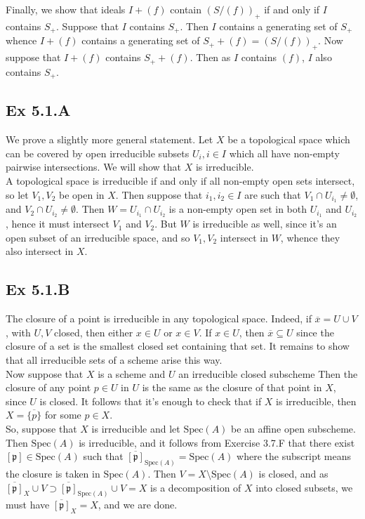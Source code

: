 \documentclass{article}
\theoremstyle{definition}
\newcommand{\Spec}{\text{Spec}}
\begin{document}
Finally, we show that ideals $I + (f)$ contain $(S/(f))_{+}$ if and only if $I$
contains $S_{+}$. Suppose that $I$ contains $S_{+}$. Then $I$ contains a
generating set of $S_{+}$ whence $I + (f)$ contains a generating set of $S_{+}
	+ (f) = (S/(f))_{+}$. Now suppose that $I + (f)$ contains $S_{+} + (f)$. Then
as $I$ contains $(f)$, $I$ also contains $S_{+}$.

\subsection*{Ex 5.1.A}

We prove a slightly more general statement. Let $X$ be a topological space which
can be covered by open irreducible subsets  $U_i, i \in I$ which all
have non-empty pairwise intersections. We will show that $X$ is irreducible. \\

A topological space is irreducible if and only if all non-empty open sets
intersect, so let $V_1, V_2$ be open in $X$. Then suppose that $i_1, i_2 \in I$
are such that $V_1 \cap U_{i_1} \not = \emptyset$, and $V_2 \cap U_{i_2} \not =
	\emptyset$. Then $W = U_{i_1} \cap U_{i_2}$ is a non-empty open set in both
$U_{i_1}$ and $U_{i_2}$, hence it must intersect $V_1$ and $V_2$. But $W$ is
irreducible as well, since it's an open subset of an irreducible space, and so
$V_1, V_2$ intersect in $W$, whence they also intersect in $X$.

\subsection*{Ex 5.1.B}

The closure of a point is irreducible in any topological space. Indeed, if
$\overline{x} = U \cup V$, with $U, V$ closed, then either $x \in U$ or $x \in
	V$. If $x \in U$, then $\overline{x} \subseteq U$ since the closure of a set is
the smallest closed set containing that set. It remains to show that all
irreducible sets of a scheme arise this way. \\

Now suppose that $X$ is a scheme and $U$ an irreducible closed subscheme Then
the closure of any point $p \in U$ in $U$ is the same as the closure of that
point in $X$, since $U$ is closed. It follows that it's enough to check that if
$X$ is irreducible, then $X = \overline{\{p\}}$ for some $p \in X$. \\

So, suppose that $X$ is irreducible and let $\Spec(A)$ be an affine open
subscheme. Then $\Spec(A)$ is irreducible, and it follows from Exercise 3.7.F
that there exist $[\mathfrak{p}] \in \Spec(A)$ such that
$\overline{[\mathfrak{p}]}_{\Spec(A)} = \Spec(A)$ where the subscript means the
closure is taken in $\Spec(A)$. Then $V = X \setminus \Spec(A)$ is closed, and
as $\overline{[\mathfrak{p}]}_X \cup V \supset
	\overline{[\mathfrak{p}]}_{\Spec(A)} \cup V = X$ is a decomposition of $X$ into
closed subsets, we must have $\overline{[\mathfrak{p}]}_X = X$, and we are
done.
\end{document}
